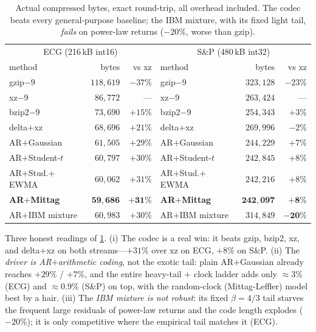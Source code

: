 \documentclass[11pt,reqno]{amsart}
\theoremstyle{plain}
\theoremstyle{definition}
\theoremstyle{remark}
\begin{document}
\begin{table}[h]
\centering\small
\begin{tabular}{lrr|lrr}
\toprule
\multicolumn{3}{c|}{ECG (216\,kB int16)} & \multicolumn{3}{c}{S\&P (480\,kB int32)}\\
method & bytes & vs xz & method & bytes & vs xz\\
\midrule
gzip$-9$            & $118{,}619$ & $-37\%$ & gzip$-9$            & $323{,}128$ & $-23\%$\\
xz$-9$              & $86{,}772$  & ---     & xz$-9$              & $263{,}424$ & ---\\
bzip2$-9$           & $73{,}690$  & $+15\%$ & bzip2$-9$           & $254{,}343$ & $+3\%$\\
delta$+$xz          & $68{,}696$  & $+21\%$ & delta$+$xz          & $269{,}996$ & $-2\%$\\
AR$+$Gaussian       & $61{,}505$  & $+29\%$ & AR$+$Gaussian       & $244{,}229$ & $+7\%$\\
AR$+$Student-$t$    & $60{,}797$  & $+30\%$ & AR$+$Student-$t$    & $242{,}845$ & $+8\%$\\
AR$+$Stud.$+$EWMA   & $60{,}062$  & $+31\%$ & AR$+$Stud.$+$EWMA   & $242{,}216$ & $+8\%$\\
\textbf{AR$+$Mittag}& $\mathbf{59{,}686}$ & $\mathbf{+31\%}$ & \textbf{AR$+$Mittag}& $\mathbf{242{,}097}$ & $\mathbf{+8\%}$\\
AR$+$IBM mixture    & $60{,}983$  & $+30\%$ & AR$+$IBM mixture    & $314{,}849$ & $\mathbf{-20\%}$\\
\bottomrule
\end{tabular}
\caption{Actual compressed bytes, exact round-trip, all overhead included. The
codec beats every general-purpose baseline; the IBM mixture, with its fixed
light tail, \emph{fails} on power-law returns ($-20\%$, worse than gzip).}
\label{tab:stage3}
\end{table}

Three honest readings of \cref{tab:stage3}. (i) The codec is a real win: it beats
gzip, bzip2, xz, and delta$+$xz on both streams---$+31\%$ over xz on ECG, $+8\%$
on S\&P. (ii) The \emph{driver is AR$+$arithmetic coding}, not the exotic tail:
plain AR$+$Gaussian already reaches $+29\%$ / $+7\%$, and the entire heavy-tail
$+$ clock ladder adds only $\approx3\%$ (ECG) and $\approx0.9\%$ (S\&P) on top,
with the random-clock (Mittag-Leffler) model best by a hair. (iii) The
\emph{IBM mixture is not robust}: its fixed $\beta=4/3$ tail starves the frequent
large residuals of power-law returns and the code length explodes ($-20\%$); it
is only competitive where the empirical tail matches it (ECG).
\end{document}
